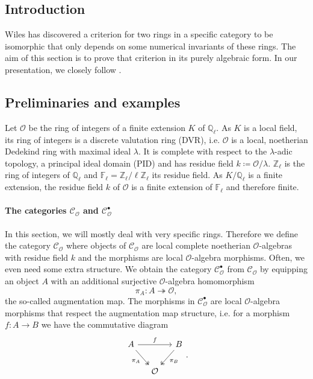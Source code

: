 \documentclass{article}
\theoremstyle{plain}%
\theoremstyle{definition}
\theoremstyle{remark}
\newcommand{\cob}{\mathcal{C}_\mathcal{O}^\bullet}
\newcommand{\co}{\mathcal{C}_\mathcal{O}}
\begin{document}
\subsection{Introduction}
Wiles has discovered a criterion for two rings in a specific category to be isomorphic 
that only depends on some numerical invariants of these rings. 
The aim of this section is to prove that criterion in its purely algebraic form. 
In our presentation, we closely follow \cite[sections 5.1 - 5.8]{Darmon1995}.

\subsection{Preliminaries and examples}
Let \(\mathcal{O}\) be the ring of integers of a finite extension \(K\) of \(\mathbb Q_\ell\). 
As \(K\) is a local field, its ring of integers is a discrete valutation ring (DVR), i.e. 
\(\mathcal O\) is a local, noetherian Dedekind ring with maximal ideal \(\lambda\). 
It is complete with respect to the \(\lambda\)-adic topology, a principal ideal domain (PID) 
and has residue field \(k \coloneqq \mathcal{O}/\lambda\).
\(\mathbb Z_\ell\) is the ring of integers of \(\mathbb Q_\ell\) and 
\(\mathbb F_\ell = \mathbb Z_\ell/\ell \mathbb Z_\ell\) its residue field. 
As \(K/\mathbb{Q}_\ell\) is a finite extension, the residue field \(k\) of \(\mathcal{O}\) 
is a finite extension of $\mathbb F_\ell$ and therefore finite.

\paragraph{The categories \(\co\) and \(\cob\)}
In this section, we will mostly deal with very specific rings. 
Therefore we define the category \(\co\) where objects of \(\co\) are local complete noetherian \(\mathcal O\)-algebras 
with residue field \(k\) and the morphisms are local \(\mathcal{O}\)-algebra morphisms.
Often, we even need some extra structure. 
We obtain the category \(\cob\) from \(\co\) by equipping an object \(A\) 
with an additional surjective \(\mathcal{O}\)-algebra homomorphism
\[\pi_A \colon A \twoheadrightarrow \mathcal{O},\]
the so-called augmentation map. The morphisms in \(\cob\) are local \(\mathcal{O}\)-algebra morphisms 
that respect the augmentation map structure, 
i.e. for a morphism \(f \colon A \to B\) we have the commutative diagram
\[
\begin{tikzcd}[column sep=small]
    A \arrow[rr, "f"] \arrow [dr, "\pi_A", swap, twoheadrightarrow] & & B \arrow [dl, "\pi_B", twoheadrightarrow]\\
    & \mathcal{O} &
\end{tikzcd}.
\]
\end{document}
